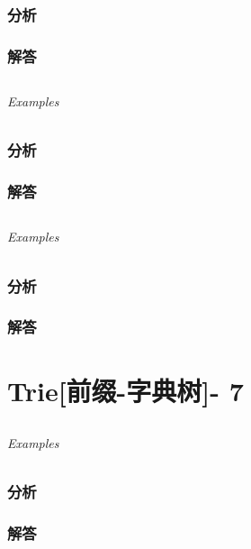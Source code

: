 \documentclass[UTF8,a4paper,12pt]{ctexbook}
\begin{document}
	\subsection{分析}
	
	\subsection{解答}
	
\section{}
	
	\subparagraph{Examples}
	
	\subsection{分析}
	
	\subsection{解答}
	
\section{}
	
	\subparagraph{Examples}
	
	\subsection{分析}
	
	\subsection{解答}
\chapter{Trie[前缀-字典树]- 7}
\section{}
	
	\subparagraph{Examples}
	
	\subsection{分析}
	
	\subsection{解答}
	
\end{document}
